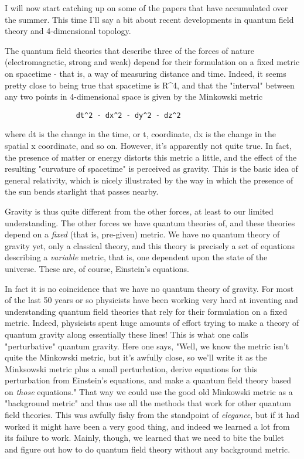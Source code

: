 

I will now start catching up on some of the papers that have accumulated
over the summer.  This time I'll say a bit about recent developments in
quantum field theory and 4-dimensional topology.  

The quantum field theories that describe three of the forces of nature
(electromagnetic, strong and weak) depend for their formulation on a
fixed metric on spacetime - that is, a way of measuring distance and
time.  Indeed, it seems pretty close to being true that spacetime is
R^4, and that the "interval" between any two points in 4-dimensional
space is given by the Minkowski metric 

\begin{verbatim}
                 dt^2 - dx^2 - dy^2 - dz^2  
\end{verbatim}
    

where dt is the change in the time, or t, coordinate, dx is the change
in the spatial x coordinate, and so on.  However, it's apparently not
quite true.  In fact, the presence of matter or energy distorts this
metric a little, and the effect of the resulting "curvature of
spacetime" is perceived as gravity.  This is the basic idea of general
relativity, which is nicely illustrated by the way in which the presence
of the sun bends starlight that passes nearby.  

Gravity is thus quite different from the other forces, at least to our
limited understanding.  The other forces we have quantum theories of,
and these theories depend on a \emph{fixed} (that is, pre-given) metric.
We have no quantum theory of gravity yet, only a classical theory,
and this theory is precisely a set of equations describing a \emph{variable}
metric, that is, one dependent upon the state of the universe.   These
are, of course, Einstein's equations.

In fact it is no coincidence that we have no quantum theory of gravity.
For most of the last 50 years or so physicists have been working very
hard at inventing and understanding quantum field theories that rely for
their formulation on a fixed metric.  Indeed, physicists spent huge
amounts of effort trying to make a theory of quantum gravity along
essentially these lines!  This is what one calls "perturbative" quantum
gravity.  Here one says, "Well, we know the metric isn't quite the
Minkowski metric, but it's awfully close, so we'll write it as the
Minksowski metric plus a small perturbation, derive equations for this
perturbation from Einstein's equations, and make a quantum field theory
based on \emph{those} equations."  That way we could use the good old
Minkowski metric as a "background metric" and thus use all the methods
that work for other quantum field theories.   This was awfully fishy
from the standpoint of \emph{elegance}, but if it had worked it might have
been a very good thing, and indeed we learned a lot from its failure to
work.  Mainly, though, we learned that we need to bite the bullet and
figure out how to do quantum field theory without any background metric.

